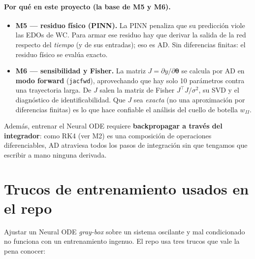 \documentclass[11pt,a4paper]{article}
\newcommand{\thetavec}{\bm{\theta}}
\newcommand{\transp}{^{\top}}
\begin{document}
\paragraph{Por qué en este proyecto (la base de M5 y M6).}
\begin{itemize}[nosep]
  \item \textbf{M5 --- residuo físico (PINN).} La PINN penaliza que su predicción viole las EDOs de WC. Para armar ese residuo hay que derivar la salida de la red respecto del \emph{tiempo} (y de sus entradas); eso es AD. Sin diferencias finitas: el residuo físico se evalúa exacto.
  \item \textbf{M6 --- sensibilidad y Fisher.} La matriz $J=\partial y/\partial\thetavec$ se calcula por AD en \textbf{modo forward} (\texttt{jacfwd}), aprovechando que hay solo 10 parámetros contra una trayectoria larga. De $J$ salen la matriz de Fisher $J\transp J/\sigma^2$, su SVD y el diagnóstico de identificabilidad. Que $J$ sea \emph{exacta} (no una aproximación por diferencias finitas) es lo que hace confiable el análisis del cuello de botella $w_{II}$.
\end{itemize}
Además, entrenar el Neural ODE requiere \textbf{backpropagar a través del integrador}: como RK4 (ver M2) es una composición de operaciones diferenciables, AD atraviesa todos los pasos de integración sin que tengamos que escribir a mano ninguna derivada.

\section{Trucos de entrenamiento usados en el repo}
\label{sec:trucos}

Ajustar un Neural ODE \emph{gray-box} sobre un sistema oscilante y mal condicionado no funciona con un entrenamiento ingenuo. El repo usa tres trucos que vale la pena conocer:
\end{document}
